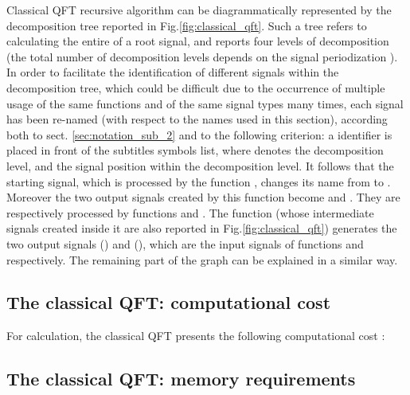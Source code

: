 \documentclass[a4paper,10pt]{article}
\begin{document}
Classical QFT recursive algorithm can be diagrammatically represented by the decomposition tree reported in Fig.\ref{fig:classical_qft}.
Such a tree refers to calculating the entire  of a  root signal, and reports four levels of decomposition (the total number of decomposition levels depends on the signal periodization ). 
In order to facilitate the identification of different signals within the decomposition tree, which could be difficult due to the occurrence of multiple usage of the same functions and of the same signal types many times, each signal has been re-named (with respect to the names used in this section), according both to sect. \ref{sec:notation_sub_2} and to the following criterion: a  identifier is placed in front of the subtitles symbols list, where  denotes the decomposition level, and  the signal position within the decomposition level.
It follows that the starting signal, which is processed by the function , changes its name from  to . 
Moreover the two output signals created by this function become  and . 
They are respectively processed by functions  and . 
The  function (whose intermediate signals created inside it are also reported in Fig.\ref{fig:classical_qft}) generates the two output signals   () and  (), which are the input signals of functions  and  respectively. 
The remaining part of the graph can be explained in a similar way.








\subsection{The classical QFT: computational cost}



For  calculation, the classical QFT presents the following computational cost \cite{Guo_Sitton_qft_1994}:




\subsection{The classical QFT: memory requirements} \label{sec:memory_old_qft}
\end{document}
